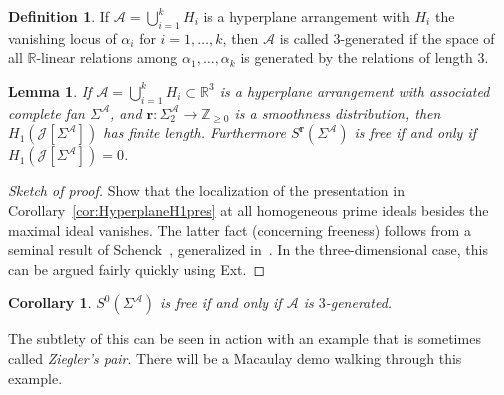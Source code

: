 \documentclass[11pt, reqno]{amsart}
\newcommand{\RR}{\mathbb{R}}
\newcommand{\ZZ}{\mathbb{Z}}
\newcommand{\br}{\mathbf{r}}
\newcommand{\calJ}{\mathcal{J}}
\newcommand{\A}{\mathcal{A}}
\newtheorem{lemma}[theorem]{Lemma}
\newtheorem{corollary}[theorem]{Corollary}
\theoremstyle{definition}
\newtheorem{definition}[theorem]{Definition}
\theoremstyle{remark}
\numberwithin{equation}{section}
\begin{document}
\begin{definition}
If $\A=\bigcup_{i=1}^k H_i$ is a hyperplane arrangement with $H_i$ the vanishing locus of $\alpha_i$ for $i=1,\ldots,k$, then $\A$ is called $3$-generated if the space of all $\RR$-linear relations among $\alpha_1,\ldots,\alpha_k$ is generated by the relations of length $3$.
\end{definition}

\begin{lemma}
If $\A=\bigcup_{i=1}^k H_i\subset\RR^3$ is a hyperplane arrangement with associated complete fan $\Sigma^\A$, and $\br:\Sigma^{\A}_2\to\ZZ_{\ge 0}$ is a smoothness distribution, then $H_1(\calJ[\Sigma^\A])$ has finite length.  Furthermore $S^{\br}(\Sigma^\A)$ is free if and only if $H_1(\calJ[\Sigma^\A])=0$.
\end{lemma}
\begin{proof}[Sketch of proof]
Show that the localization of the presentation in Corollary~\ref{cor:HyperplaneH1pres} at all homogeneous prime ideals besides the maximal ideal vanishes.  The latter fact (concerning freeness) follows from a seminal result of Schenck~\cite{Spect}, generalized in~\cite[Theorem~3.4]{CohVan}.  In the three-dimensional case, this can be argued fairly quickly using Ext.
\end{proof}

\begin{corollary}
$S^0(\Sigma^\A)$ is free if and only if $\A$ is $3$-generated.
\end{corollary}

The subtlety of this can be seen in action with an example that is sometimes called \textit{Ziegler's pair}.  There will be a Macaulay demo walking through this example.



\end{document}
